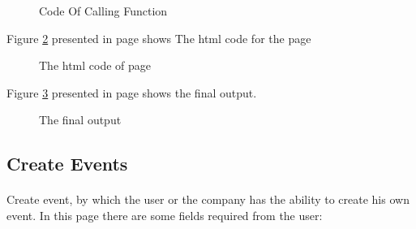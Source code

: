 \documentclass[12pt,a4paper,class,twoside,openany]{report}
\begin{document}
{\begin{figure}
\begin{center}
{}
\caption{Code Of Calling Function}
\label{fg:4-18}
\end{center}
\end{figure}
Figure \ref{fg:4-19} presented in page \pageref{fg:4-19} shows The html code for the page
\begin{figure}
\begin{center}
\caption{The html code of page}
\label{fg:4-19}
\end{center}
\end{figure}
Figure \ref{fg:4-20} presented in page \pageref{fg:4-20} shows the final output.
\begin{figure}
\begin{center}
\caption{The final output}
\label{fg:4-20}
\end{center}
\end{figure}
\subsection{Create Events}
\paragraph*{\hspace{.9 cm} } Create event, by which the user or the company has the ability to create his own event. In this page there are some fields required from the user:
\begin{itemize}


\end{itemize}}
\end{document}
